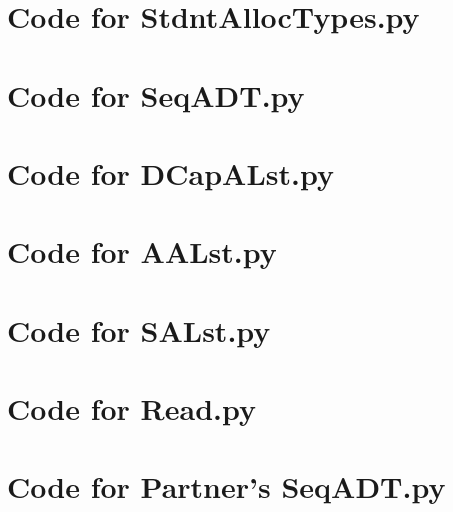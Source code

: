 \documentclass[12pt]{article}
\begin{document}
\newpage

\lstset{language=Python, basicstyle=\tiny, breaklines=true, showspaces=false,
  showstringspaces=false, breakatwhitespace=true}

\def\thesection{\Alph{section}}

\section{Code for StdntAllocTypes.py}

\noindent 

\newpage

\section{Code for SeqADT.py}

\noindent 

\newpage

\section{Code for DCapALst.py}

\noindent 

\newpage

\section{Code for AALst.py}

\noindent 

\newpage

\section{Code for SALst.py}

\noindent 

\newpage

\section{Code for Read.py}

\noindent 

\newpage

\section{Code for Partner's SeqADT.py}
\end{document}
